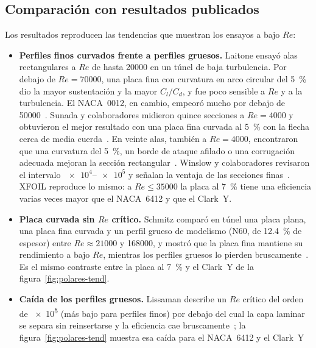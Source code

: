 \subsection{Comparación con resultados publicados}
Los resultados reproducen las tendencias que muestran los ensayos a bajo $Re$:
\begin{itemize}
  \item \textbf{Perfiles finos curvados frente a perfiles gruesos.} Laitone ensayó alas
        rectangulares a $Re$ de hasta \num{20000} en un túnel de baja turbulencia. Por
        debajo de $Re=\num{70000}$, una placa fina con curvatura en arco circular del
        \SI{5}{\percent} dio la mayor sustentación y la mayor $C_l/C_d$, y fue poco
        sensible a $Re$ y a la turbulencia. El NACA~0012, en cambio, empeoró mucho por
        debajo de \num{50000}~\cite{polares-laitone1997}. Sunada y colaboradores
        midieron quince secciones a $Re=\num{4000}$ y obtuvieron el mejor resultado con
        una placa fina curvada al \SI{5}{\percent} con la flecha cerca de media
        cuerda~\cite{polares-sunada1997}. En veinte alas, también a $Re=\num{4000}$,
        encontraron que una curvatura del \SI{5}{\percent}, un borde de ataque afilado o
        una corrugación adecuada mejoran la sección rectangular~\cite{polares-sunada2002}. Winslow y
        colaboradores revisaron el intervalo $\num{e4}$--$\num{e5}$ y señalan la ventaja de
        las secciones finas~\cite{polares-winslow2018}. XFOIL reproduce lo mismo: a
        $Re\le\num{35000}$ la placa al \SI{7}{\percent} tiene una eficiencia varias veces
        mayor que el NACA~6412 y que el Clark~Y.
  \item \textbf{Placa curvada sin $Re$ crítico.} Schmitz comparó en túnel una placa
        plana, una placa fina curvada y un perfil grueso de modelismo (N60, de
        \SI{12.4}{\percent} de espesor) entre $Re\approx\num{21000}$ y \num{168000}, y
        mostró que la placa fina mantiene su rendimiento a bajo $Re$,
        mientras los perfiles gruesos lo pierden bruscamente~\cite{schmitz1942}. Es el
        mismo contraste entre la placa al \SI{7}{\percent} y el Clark~Y de la
        figura~\ref{fig:polares-tend}.
  \item \textbf{Caída de los perfiles gruesos.} Lissaman describe un $Re$ crítico del orden
        de \num{e5} (más bajo para perfiles finos) por debajo del cual la capa laminar se
        separa sin reinsertarse y la eficiencia cae bruscamente~\cite{lissaman1983}; la
        figura~\ref{fig:polares-tend} muestra esa caída para el NACA~6412 y el Clark~Y

\end{itemize}

